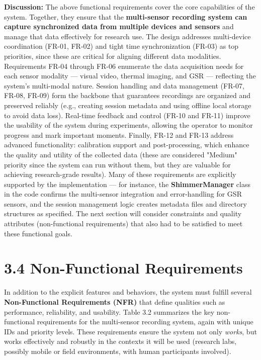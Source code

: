 \textbf{Discussion:} The above functional requirements cover the core
capabilities of the system. Together, they ensure that the
\textbf{multi-sensor recording system can capture synchronized data from
multiple devices and sensors} and manage that data effectively for
research use. The design addresses multi-device coordination (FR-01,
FR-02) and tight time synchronization (FR-03) as top priorities, since
these are critical for aligning different data modalities. Requirements
FR-04 through FR-06 enumerate the data acquisition needs for each sensor
modality --- visual video, thermal imaging, and GSR --- reflecting the
system's multi-modal nature. Session handling and data management
(FR-07, FR-08, FR-09) form the backbone that guarantees recordings are
organized and preserved reliably (e.g., creating session metadata and
using offline local storage to avoid data loss). Real-time feedback and
control (FR-10 and FR-11) improve the usability of the system during
experiments, allowing the operator to monitor progress and mark
important moments. Finally, FR-12 and FR-13 address advanced
functionality: calibration support and post-processing, which enhance
the quality and utility of the collected data (these are considered
"Medium" priority since the system can run without them, but they are
valuable for achieving research-grade results). Many of these
requirements are explicitly supported by the implementation --- for
instance, the \textbf{ShimmerManager} class in the code confirms the
multi-sensor integration and error-handling for GSR
sensors\cite{ref2}\cite{ref1},
and the session management logic creates metadata files and directory
structures as
specified\cite{ref3}\cite{ref4}.
The next section will consider constraints and quality attributes
(non-functional requirements) that also had to be satisfied to meet
these functional goals.

\section{3.4 Non-Functional Requirements}

In addition to the explicit features and behaviors, the system must
fulfill several \textbf{Non-Functional Requirements (NFR)} that define
qualities such as performance, reliability, and usability. Table 3.2
summarizes the key non-functional requirements for the multi-sensor
recording system, again with unique IDs and priority levels. These
requirements ensure the system not only \textit{works}, but works effectively
and robustly in the contexts it will be used (research labs, possibly
mobile or field environments, with human participants involved).

